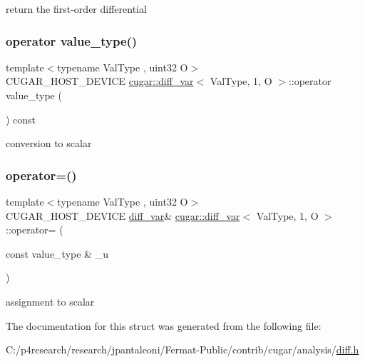 return the first-\/order differential \mbox{\label{structcugar_1_1diff__var_3_01_val_type_00_011_00_01_o_01_4_ace7b3845ff1b58f06b30e05dee3e83f5}} 
\subsubsection{\texorpdfstring{operator value\+\_\+type()}{operator value\_type()}}
{\footnotesize\ttfamily template$<$typename Val\+Type , uint32 O$>$ \\
C\+U\+G\+A\+R\+\_\+\+H\+O\+S\+T\+\_\+\+D\+E\+V\+I\+CE \hyperlink{structcugar_1_1diff__var}{cugar\+::diff\+\_\+var}$<$ Val\+Type, 1, O $>$\+::operator value\+\_\+type (\begin{DoxyParamCaption}{ }\end{DoxyParamCaption}) const\hspace{0.3cm}{\ttfamily [inline]}}

conversion to scalar \mbox{\label{structcugar_1_1diff__var_3_01_val_type_00_011_00_01_o_01_4_a287e871a6b4be78523301a7586b8db45}} 
\subsubsection{\texorpdfstring{operator=()}{operator=()}}
{\footnotesize\ttfamily template$<$typename Val\+Type , uint32 O$>$ \\
C\+U\+G\+A\+R\+\_\+\+H\+O\+S\+T\+\_\+\+D\+E\+V\+I\+CE \hyperlink{structcugar_1_1diff__var}{diff\+\_\+var}\& \hyperlink{structcugar_1_1diff__var}{cugar\+::diff\+\_\+var}$<$ Val\+Type, 1, O $>$\+::operator= (\begin{DoxyParamCaption}\item[{const value\+\_\+type \&}]{\+\_\+u }\end{DoxyParamCaption})\hspace{0.3cm}{\ttfamily [inline]}}

assignment to scalar 

The documentation for this struct was generated from the following file\+:\begin{DoxyCompactItemize}
\item 
C\+:/p4research/research/jpantaleoni/\+Fermat-\/\+Public/contrib/cugar/analysis/\hyperlink{diff_8h}{diff.\+h}\end{DoxyCompactItemize}
